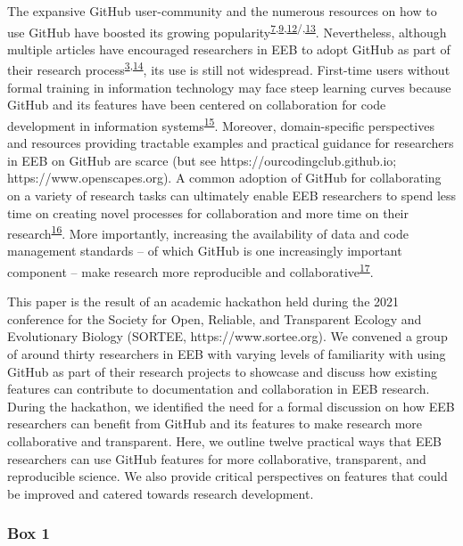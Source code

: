 The expansive GitHub user-community and the numerous resources on how to use GitHub have boosted its growing popularity\textsuperscript{\protect\hyperlink{ref-RVetqmsg}{7},\protect\hyperlink{ref-kEX5dgzK}{9},\protect\hyperlink{ref-13jOlVcpp}{12}/,\protect\hyperlink{ref-u5aEVE4B}{13}}.
Nevertheless, although multiple articles have encouraged researchers in EEB to adopt GitHub as part of their research process\textsuperscript{\protect\hyperlink{ref-10ghgV3S8}{3},\protect\hyperlink{ref-3DKwn1sY}{14}}, its use is still not widespread.
First-time users without formal training in information technology may face steep learning curves because GitHub and its features have been centered on collaboration for code development in information systems\textsuperscript{\protect\hyperlink{ref-139b0pSGc}{15}}.
Moreover, domain-specific perspectives and resources providing tractable examples and practical guidance for researchers in EEB on GitHub are scarce (but see https://ourcodingclub.github.io; https://www.openscapes.org).
A common adoption of GitHub for collaborating on a variety of research tasks can ultimately enable EEB researchers to spend less time on creating novel processes for collaboration and more time on their research\textsuperscript{\protect\hyperlink{ref-ydrk01SR}{16}}.
More importantly, increasing the availability of data and code management standards -- of which GitHub is one increasingly important component -- make research more reproducible and collaborative\textsuperscript{\protect\hyperlink{ref-13QX8XU3J}{17}}.

This paper is the result of an academic hackathon held during the 2021 conference for the Society for Open, Reliable, and Transparent Ecology and Evolutionary Biology (SORTEE, https://www.sortee.org).
We convened a group of around thirty researchers in EEB with varying levels of familiarity with using GitHub as part of their research projects to showcase and discuss how existing features can contribute to documentation and collaboration in EEB research.
During the hackathon, we identified the need for a formal discussion on how EEB researchers can benefit from GitHub and its features to make research more collaborative and transparent.
Here, we outline twelve practical ways that EEB researchers can use GitHub features for more collaborative, transparent, and reproducible science.
We also provide critical perspectives on features that could be improved and catered towards research development.

\hypertarget{definitions}{%
\subsubsection{Box 1}\label{definitions}}

